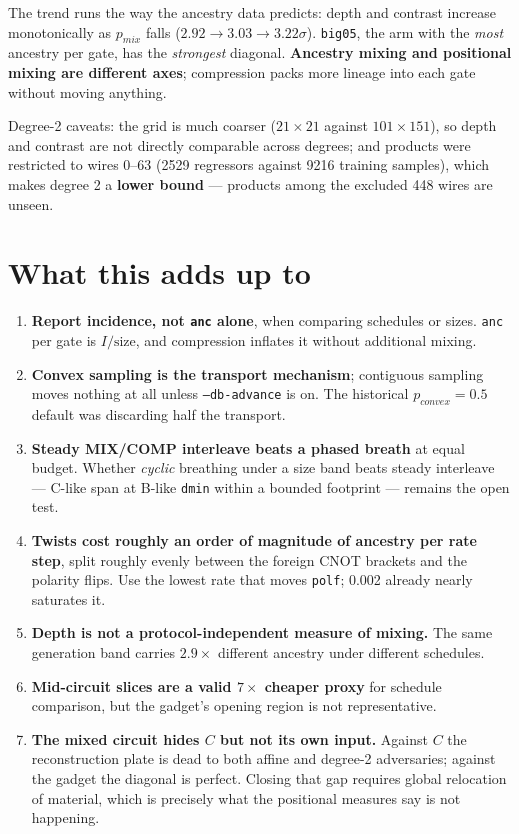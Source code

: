 \documentclass[11pt]{article}
\begin{document}
The trend runs the way the ancestry data predicts: depth and contrast increase
monotonically as $p_{mix}$ falls ($2.92 \to 3.03 \to 3.22\sigma$).
\texttt{big05}, the arm with the \emph{most} ancestry per gate, has the
\emph{strongest} diagonal. \textbf{Ancestry mixing and positional mixing are
different axes}; compression packs more lineage into each gate without moving
anything.

\medskip
\noindent Degree-2 caveats: the grid is much coarser ($21\times21$ against
$101\times151$), so depth and contrast are not directly comparable across
degrees; and products were restricted to wires 0--63 (2529 regressors against
9216 training samples), which makes degree 2 a \textbf{lower bound} --- products
among the excluded 448 wires are unseen.

\section{What this adds up to}

\begin{enumerate}
\item \textbf{Report incidence, not \texttt{anc} alone}, when comparing
schedules or sizes. \texttt{anc} per gate is $I/\text{size}$, and compression
inflates it without additional mixing.
\item \textbf{Convex sampling is the transport mechanism}; contiguous sampling
moves nothing at all unless \texttt{--db-advance} is on. The historical
$p_{convex}=0.5$ default was discarding half the transport.
\item \textbf{Steady MIX/COMP interleave beats a phased breath} at equal budget.
Whether \emph{cyclic} breathing under a size band beats steady interleave ---
C-like span at B-like \texttt{dmin} within a bounded footprint --- remains the
open test.
\item \textbf{Twists cost roughly an order of magnitude of ancestry per rate
step}, split roughly evenly between the foreign CNOT brackets and the polarity
flips. Use the lowest rate that moves \texttt{polf}; 0.002 already nearly
saturates it.
\item \textbf{Depth is not a protocol-independent measure of mixing.} The same
generation band carries $2.9\times$ different ancestry under different schedules.
\item \textbf{Mid-circuit slices are a valid $7\times$ cheaper proxy} for
schedule comparison, but the gadget's opening region is not representative.
\item \textbf{The mixed circuit hides $C$ but not its own input.} Against $C$ the
reconstruction plate is dead to both affine and degree-2 adversaries; against the
gadget the diagonal is perfect. Closing that gap requires global relocation of
material, which is precisely what the positional measures say is not happening.
\end{enumerate}
\end{document}
